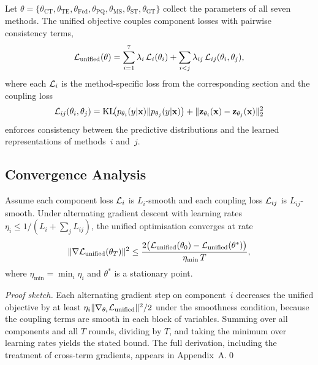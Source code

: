 Let $\theta=\{\theta_{\mathrm{CT}},\theta_{\mathrm{TE}},\theta_{\mathrm{Fed}},\theta_{\mathrm{PQ}},\theta_{\mathrm{MS}},\theta_{\mathrm{ST}},\theta_{\mathrm{GT}}\}$ collect the parameters of all seven methods. The unified objective couples component losses with pairwise consistency terms,
\begin{equation}
\mathcal{L}_{\mathrm{unified}}(\theta)
= \sum_{i=1}^{7}\lambda_i\,\mathcal{L}_i(\theta_i)
+ \sum_{i<j}\lambda_{ij}\,\mathcal{L}_{ij}(\theta_i,\theta_j),
\label{eq:unified_obj}
\end{equation}
where each $\mathcal{L}_i$ is the method-specific loss from the corresponding section and the coupling loss
\begin{equation}
\mathcal{L}_{ij}(\theta_i,\theta_j)
= \mathrm{KL}\!\bigl(p_{\theta_i}(y|\mathbf{x})\|p_{\theta_j}(y|\mathbf{x})\bigr)
+ \|\mathbf{z}_{\theta_i}(\mathbf{x})-\mathbf{z}_{\theta_j}(\mathbf{x})\|_2^2
\label{eq:unified_coupling}
\end{equation}
enforces consistency between the predictive distributions and the learned representations of methods~$i$ and~$j$.

\subsection{Convergence Analysis}

\begin{theorem}
\label{thm:unified}
Assume each component loss $\mathcal{L}_i$ is $L_i$-smooth and each coupling loss $\mathcal{L}_{ij}$ is $L_{ij}$-smooth. Under alternating gradient descent with learning rates $\eta_i\le 1/(L_i+\sum_j L_{ij})$, the unified optimisation converges at rate
\begin{equation}
\|\nabla\mathcal{L}_{\mathrm{unified}}(\theta_T)\|^2
\le \frac{2\bigl(\mathcal{L}_{\mathrm{unified}}(\theta_0)
  -\mathcal{L}_{\mathrm{unified}}(\theta^*)\bigr)}{\eta_{\min}\,T},
\label{eq:unified_conv}
\end{equation}
where $\eta_{\min}=\min_i\eta_i$ and $\theta^*$ is a stationary point.
\end{theorem}

\noindent\textit{Proof sketch.} Each alternating gradient step on component~$i$ decreases the unified objective by at least $\eta_i\|\nabla_{\theta_i}\mathcal{L}_{\mathrm{unified}}\|^2/2$ under the smoothness condition, because the coupling terms are smooth in each block of variables. Summing over all components and all $T$ rounds, dividing by $T$, and taking the minimum over learning rates yields the stated bound. The full derivation, including the treatment of cross-term gradients, appears in Appendix~A.\qed

